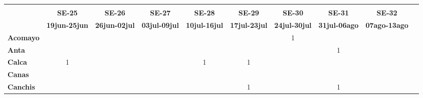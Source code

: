 \begin{tabular}{lccccccccc}
	\textbf{}              	  & \multicolumn{1}{l}{}                        & \multicolumn{1}{l}{}      & \multicolumn{1}{l}{}                         & \multicolumn{1}{l}{}                         & \multicolumn{1}{l}{}                         & \multicolumn{1}{l}{}                        & \multicolumn{1}{l}{}                         & \multicolumn{1}{l}{}     \\                   
	\textbf{}                                                                          		
	&\textbf{SE-25}								&\textbf{SE-26}								&\textbf{SE-27}								&\textbf{SE-28}								&\textbf{SE-29} 							&\textbf{SE-30}								&\textbf{SE-31} 							&\textbf{SE-32}\\							
	\textbf{}              	  		
	&\textbf{19jun-25jun}
	&\textbf{26jun-02jul}						&\textbf{03jul-09jul}
	&\textbf{10jul-16jul}						&\textbf{17jul-23jul}
	&\textbf{24jul-30jul}						&\textbf{31jul-06ago}
	&\textbf{07ago-13ago}\\
	\textbf{Acomayo}                        		
	&\cellcolor[HTML]{FCC46C}
	&\cellcolor[HTML]{FCC46C}					&\cellcolor[HTML]{FCC46C}
	&\cellcolor[HTML]{FCC46C}					&\cellcolor[HTML]{FCC46C}
	&1											&\cellcolor[HTML]{FCC46C}
	&\cellcolor[HTML]{FCC46C}\\
	\textbf{Anta}                                                   		
	&\cellcolor[HTML]{FCC46C}					&\cellcolor[HTML]{FCC46C} 					&\cellcolor[HTML]{FCC46C}					&\cellcolor[HTML]{FCC46C}					&\cellcolor[HTML]{FCC46C}					&\cellcolor[HTML]{FCC46C}					
	&1											&\cellcolor[HTML]{FCC46C}\\					
	\textbf{Calca}      				       								            
	&1											&\cellcolor[HTML]{FCC46C}					&\cellcolor[HTML]{FCC46C}					&1				   							&1  										&\cellcolor[HTML]{FCC46C}	 	 	    	&\cellcolor[HTML]{FCC46C}					&\cellcolor[HTML]{FCC46C}\\          			
	\textbf{Canas}                              											
	&\cellcolor[HTML]{FCC46C}					&\cellcolor[HTML]{FCC46C}
	&\cellcolor[HTML]{FCC46C} 					&\cellcolor[HTML]{FCC46C}
	&\cellcolor[HTML]{FCC46C}					&\cellcolor[HTML]{FCC46C}
	&\cellcolor[HTML]{FCC46C}					&\cellcolor[HTML]{FCC46C}\\	
	\textbf{Canchis}                             											
	&\cellcolor[HTML]{FCC46C}					&\cellcolor[HTML]{FCC46C}					&\cellcolor[HTML]{FCC46C}					&\cellcolor[HTML]{FCC46C}					&1					
	&\cellcolor[HTML]{FCC46C}					&1			&\cellcolor[HTML]{FCC46C}\\											

\end{tabular}
